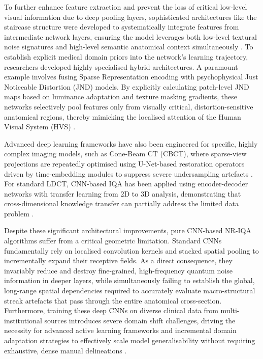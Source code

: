 To further enhance feature extraction and prevent the loss of critical low-level visual
information due to deep pooling layers, sophisticated architectures like the staircase
structure were developed to systematically integrate features from intermediate network
layers, ensuring the model leverages both low-level textural noise signatures and
high-level semantic anatomical context simultaneously \cite{hosu2020koniq}. To establish
explicit medical domain priors into the network's learning trajectory, researchers
developed highly specialised hybrid architectures. A paramount example involves fusing
Sparse Representation encoding with psychophysical Just Noticeable Distortion (JND)
models. By explicitly calculating patch-level JND maps based on luminance adaptation and
texture masking gradients, these networks selectively pool features only from visually
critical, distortion-sensitive anatomical regions, thereby mimicking the localised
attention of the Human Visual System (HVS) \cite{shen2025jnd}.

Advanced deep learning frameworks have also been engineered for specific, highly complex
imaging models, such as Cone-Beam CT (CBCT), where sparse-view projections are repeatedly
optimised using U-Net-based restoration operators driven by time-embedding modules to
suppress severe undersampling artefacts \cite{greenspan2023miccai_cbct}. For standard
LDCT, CNN-based IQA has been applied using encoder-decoder networks with transfer learning
from 2D to 3D analysis, demonstrating that cross-dimensional knowledge transfer can
partially address the limited data problem \cite{shan2018transfer}.

Despite these significant architectural improvements, pure CNN-based NR-IQA algorithms
suffer from a critical geometric limitation. Standard CNNs fundamentally rely on
localised convolution kernels and stacked spatial pooling to incrementally expand their
receptive fields. As a direct consequence, they invariably reduce and destroy fine-grained,
high-frequency quantum noise information in deeper layers, while simultaneously failing
to establish the global, long-range spatial dependencies required to accurately evaluate
macro-structural streak artefacts that pass through the entire anatomical cross-section.
Furthermore, training these deep CNNs on diverse clinical data from multi-institutional
sources introduces severe domain shift challenges, driving the necessity for advanced
active learning frameworks and incremental domain adaptation strategies to effectively
scale model generalisability without requiring exhaustive, dense manual delineations
\cite{greenspan2023miccai_domain}.


